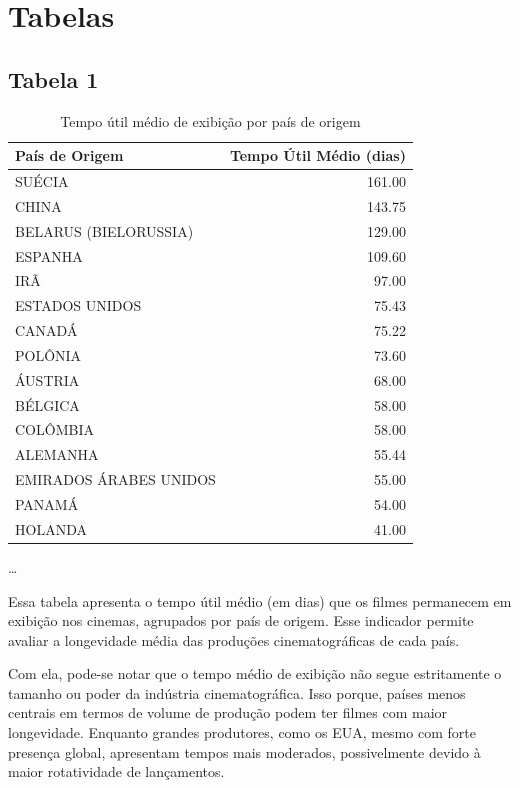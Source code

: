 \documentclass{article}
\begin{document}
\section{Tabelas}

\subsection*{Tabela 1}

\begin{table}[H]
\centering
\caption{Tempo útil médio de exibição por país de origem}
\begin{small}
\begin{tabular}{l r}
\hline
\textbf{País de Origem} & \textbf{Tempo Útil Médio (dias)} \\
\hline
SUÉCIA & 161.00 \\
CHINA & 143.75 \\
BELARUS (BIELORUSSIA) & 129.00 \\
ESPANHA & 109.60 \\
IRÃ & 97.00 \\
ESTADOS UNIDOS & 75.43 \\
CANADÁ & 75.22 \\
POLÔNIA & 73.60 \\
ÁUSTRIA & 68.00 \\
BÉLGICA & 58.00 \\
COLÔMBIA & 58.00 \\
ALEMANHA & 55.44 \\
EMIRADOS ÁRABES UNIDOS & 55.00 \\
PANAMÁ & 54.00 \\
HOLANDA & 41.00 \\
\end{tabular}
\end{small}

\begin{center}
\small
\ldots
\end{center}

\end{table}
 
 Essa tabela apresenta o tempo útil médio (em dias) que os filmes permanecem em exibição nos cinemas,
agrupados por país de origem. Esse indicador permite avaliar a longevidade média das produções cinematográficas de cada país.

Com ela, pode-se notar que o tempo médio de exibição não segue estritamente o tamanho ou poder da indústria cinematográfica.
Isso porque, países menos centrais em termos de volume de produção podem ter filmes com maior longevidade. Enquanto grandes produtores,
como os EUA, mesmo com forte presença global, apresentam tempos mais moderados, possivelmente devido à maior rotatividade de lançamentos.
\end{document}
